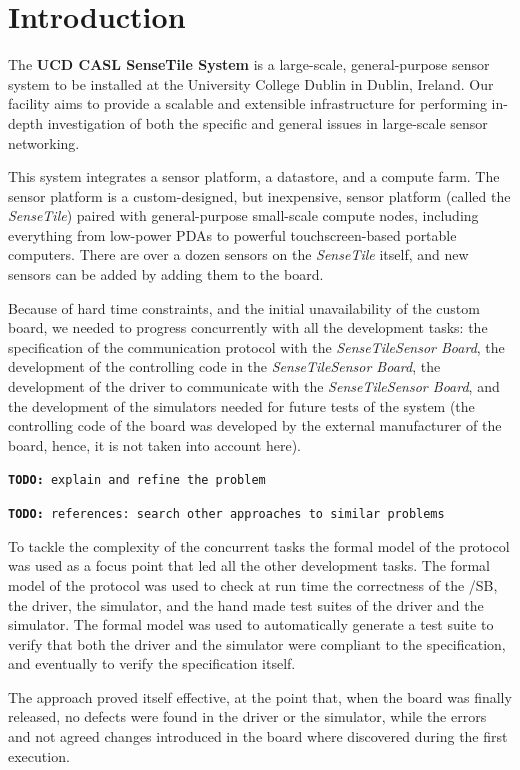 \documentclass{article} \usepackage{times}
\newcommand{\todo}[1]{\texttt{\textbf{TODO:} #1}}
\newcommand{\ST}{\emph{SenseTile}\xspace}
\newcommand{\SB}{\emph{Sensor Board}\xspace}
\newcommand{\STSB}{\ST \SB\xspace}
\begin{document}
\section{Introduction}

The \textbf{UCD CASL SenseTile System} is a large-scale, general-purpose
sensor system to be installed at the University College Dublin in Dublin,
Ireland. 
Our facility aims to provide a scalable and extensible 
infrastructure for performing in-depth investigation of both the specific 
and general issues in large-scale sensor networking.

This system integrates a sensor platform, a datastore, and a compute
farm.  
The sensor platform is a custom-designed, but inexpensive,
sensor platform (called the \ST) paired with general-purpose
small-scale compute nodes, including everything from low-power PDAs to
powerful touchscreen-based portable computers. 
There are over a dozen
sensors on the \ST itself, and new sensors can be added by adding them
to the board.

Because of hard time constraints, and the initial unavailability of the 
custom board, we needed to progress concurrently with all the development tasks: 
the specification of the communication protocol with the \STSB, the development of 
the controlling code in the \STSB, the development of the driver to communicate 
with the \STSB, and the development of the simulators needed for future tests 
of the system (the controlling code of the board was developed by the external 
manufacturer of the board, hence, it is not taken into account here).

\todo{explain and refine the problem}

\todo{references: search other approaches to similar problems}

To tackle the complexity of the concurrent tasks the formal model of the protocol 
was used as a focus point that led all the other development tasks. 
The formal model of the protocol was used to check at run time the correctness of 
the /SB, the driver, the simulator, and the hand made test suites of the driver 
and the simulator.
The formal model was used to automatically generate a test suite to verify that
both the driver and the simulator were compliant to the specification, and eventually 
to verify the specification itself.

The approach proved itself effective, at the point that, when the board was finally 
released, no defects were found in the driver or the simulator, while the errors and 
not agreed changes introduced in the board where discovered during the first execution.
\end{document}
